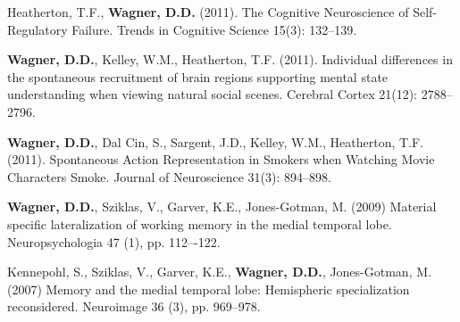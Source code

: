 \documentclass[11pt,letter,roman]{moderncv}
\begin{document}
\begin{bibenum}
\item Heatherton, T.F., \textbf{Wagner, D.D.} (2011). The Cognitive Neuroscience of Self-Regulatory Failure. Trends in Cognitive Science 15(3): 132--139.

\item \textbf{Wagner, D.D.}, Kelley, W.M., Heatherton, T.F. (2011). Individual differences in the spontaneous recruitment of brain regions supporting mental state understanding when viewing natural social scenes. Cerebral Cortex 21(12): 2788--2796.

\item \textbf{Wagner, D.D.}, Dal Cin, S., Sargent, J.D., Kelley, W.M., Heatherton, T.F. (2011).
Spontaneous Action Representation in Smokers when Watching Movie Characters Smoke. Journal of Neuroscience 31(3): 894--898.
			
\item \textbf{Wagner, D.D.}, Sziklas, V., Garver, K.E., Jones-Gotman, M. (2009) Material specific
lateralization of working memory in the medial temporal lobe. Neuropsychologia
47 (1), pp. 112–-122.

\item Kennepohl, S., Sziklas, V., Garver, K.E., \textbf{Wagner, D.D.}, Jones-Gotman, M. (2007) Memory and the medial temporal lobe: Hemispheric specialization reconsidered. Neuroimage 36 (3), pp. 969--978.
\end{bibenum}
\cvitem{}{}
\cvitem{}{}
\end{document}
